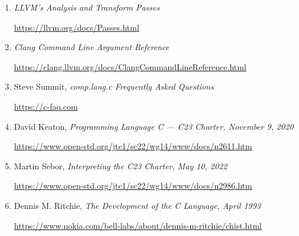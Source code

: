 \begin{enumerate}
\item \it{LLVM's Analysis and Transform Passes}

\url{https://llvm.org/docs/Passes.html}

\enlargethispage*{\baselineskip}
\enlargethispage*{\baselineskip}
\enlargethispage*{\baselineskip}

\item \it{Clang Command Line Argument Reference}

\url{https://clang.llvm.org/docs/ClangCommandLineReference.html}

\item Steve Summit, \it{comp.lang.c Frequently Asked Questions}

\url{https://c-faq.com}

\item David Keaton, \it{Programming Language C — C23 Charter}, November 9, 2020

\url{https://www.open-std.org/jtc1/sc22/wg14/www/docs/n2611.htm}

\item Martin Sebor, \it{Interpreting the C23 Charter}, May 10, 2022

\url{https://www.open-std.org/jtc1/sc22/wg14/www/docs/n2986.htm}

\item Dennis M. Ritchie, \it{The Development of the C Language}, April 1993

\url{https://www.nokia.com/bell-labs/about/dennis-m-ritchie/chist.html}

\end{enumerate}
